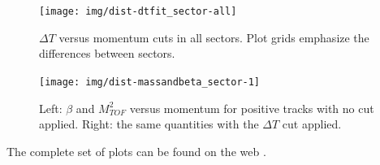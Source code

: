 \clearpage\newpage

\begin{figure}[ht]
	\centering
		\texttt{[image: img/dist-dtfit\_sector-all]}
		\caption{$\Delta T$ versus momentum cuts in all sectors. Plot grids
					emphasize the differences between sectors.}
		\label{fig:dt_vs_mom_all_sectors}
\end{figure}

\clearpage\newpage

\begin{figure}[ht]
	\centering
		\texttt{[image: img/dist-massandbeta\_sector-1]}
		\caption{Left: $\beta$ and $M_{TOF}^2$ versus momentum for positive
					tracks with no cut applied. Right: the same quantities with the
					$\Delta T$ cut applied.}
		\label{fig:mass_beta_vs_p_sect5}
\end{figure}

The complete set of plots can be found on the web \cite{bib:pi0_resonance_id_proton}.


\clearpage







